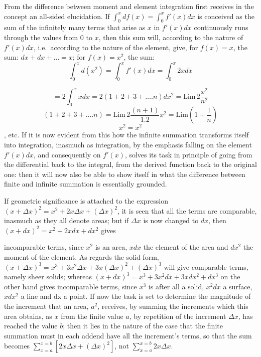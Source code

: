 \documentclass[12pt,a4paper,openany]{book}
\newcommand{\opage}[1]{\marginnote{\footnotesize\textit{[#1]}}}
\begin{document}
From the difference between moment and element integration
first receives in the concept an all-sided elucidation. If $\int_{0}^{x}df(x)=\int_{0}^{x}f'(x)dx$ is conceived as the sum of the infinitely many
terms that arise as $x$ in $f'(x)dx$ continuously runs through
the values from $0$ to $x$, then this sum will, according to
the nature of $f'(x)dx$, i.e.\ according to the nature of the element,
give, for $f(x)=x$, the sum: $dx+dx+\ldots=x$; for $f(x)=x^{2}$, the sum:
\[ \int_{0}^{x}d(x^{2})=\int_{0}^{x}f'(x)dx=\int_{0}^{x}2xdx \]

\[ =2\int_{0}^{x}xdx=2(1+2+3+\ldots.n)dx^{2}=\mathrm{Lim}\,2\frac{x^{2}}{n^{2}} \]
\[ (1+2+3+\ldots.n)=\mathrm{Lim}\,2\frac{(n+1)}{1.2}x^{2}=\mathrm{Lim}(1+\frac{1}{n}) \]
\[ x^{2}=x^{2} \]
, etc. If it is now evident from this how the
infinite summation transforms itself into integration, inasmuch as
integration, by the emphasis falling on the element $f'(x)dx$, and consequently on $f'(x)$, solves its task in principle
\setcounter{footnote}{0}%
\opage{106}of going from the differential back to the integral, from the derived
function back to the original one: then it will now
also be able to show itself in what the difference between finite and
infinite summation is essentially grounded.

If geometric significance is attached to the expression $(x+\Delta x)^{2}=x^{2}+2x\Delta x+(\Delta x)^{2}$, it is seen that all the terms are
comparable, inasmuch as they all denote areas; but if
$\Delta x$ is now changed to $dx$, then $(x+dx)^{2}=x^{2}+2xdx+dx^{2}$ gives

incomparable terms, since $x^{2}$ is an area, $xdx$ the element of the area and $dx^{2}$ the moment of the element. As regards the solid
form, $(x+\Delta x)^{3}=x^{3}+3x^{2}\Delta x+3x(\Delta x)^{2}+(\Delta x)^{3}$ will give comparable terms, namely sheer solids; whereas $(x+dx)^{3}=x^{3}+3x^{2}dx+3xdx^{2}+dx^{3}$ on the other hand gives incomparable
terms, since $x^{3}$ is after all a solid, $x^{2}dx$ a surface, $xdx^{2}$ a line
and dx a point. If now the task is set to determine
the magnitude of the increment that an area, $a^{2}$, receives, by summing
the increments which this area obtains, as $x$ from the
finite value $a$, by repetition of the increment $\Delta x$, has reached the value $b$; then it lies in the nature of the case that the
finite summation must in each addend have all the increment's
terms, so that the sum becomes $\sum_{x=a}^{x=b}[2x\Delta x+(\Delta x)^{2}]$, not $\sum_{x=a}^{x=b}2x\Delta x$.
\end{document}
